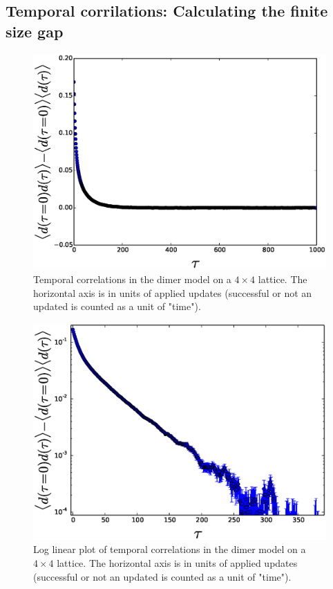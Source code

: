 \documentclass[aps,floatfix,11pt]{revtex4-1}
\begin{document}
\subsection{Temporal corrilations: Calculating the finite size gap}
\begin{figure}[h]
    \centering
    \includegraphics[width=8.5 cm]{time_cor_dmr_dmr_model_dmr_dmr_4x4}
    \caption{Temporal correlations in the dimer model on a $4\times 4$ lattice. The horizontal axis
    is in units of applied updates (successful or not an updated is counted as a unit of "time"). }
    \label{fig:time_cor_dmr_dmr_model_dmr_dmr_4x4}
\end{figure}

\begin{figure}[h]
    \centering
    \includegraphics[width=8.5 cm]{time_cor_dmr_dmr_model_dmr_dmr_log_4x4}
    \caption{Log linear plot of temporal correlations in the dimer model on a $4\times 4$ lattice. The horizontal axis
    is in units of applied updates (successful or not an updated is counted as a unit of "time"). }
    \label{fig:time_cor_dmr_dmr_model_dmr_dmr_log_4x4}
\end{figure}
\end{document}
